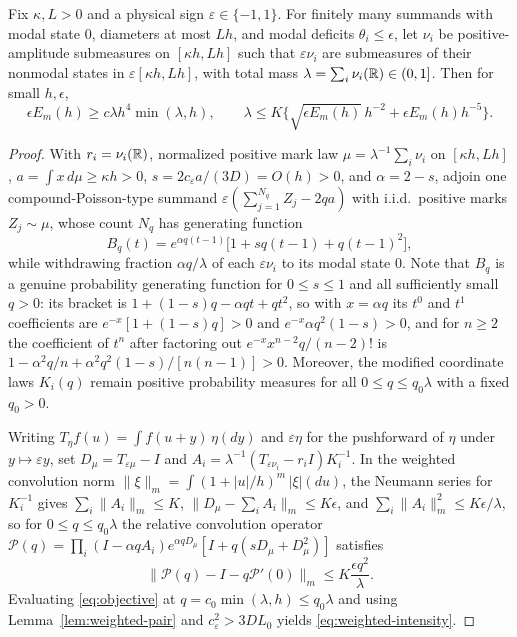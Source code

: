 \begin{lemma}\label{lem:weighted-intensity}
Fix $\kappa,L>0$ and a physical sign $\varepsilon\in\{-1,1\}$. For finitely
many summands with modal state $0$, diameters at most $Lh$, and modal deficits
$\theta_i\le\epsilon$, let $\nu_i$ be positive-amplitude submeasures on
$[\kappa h,Lh]$ such that $\varepsilon\nu_i$ are submeasures of their nonmodal
states in $\varepsilon[\kappa h,Lh]$, with total mass
$\lambda=\sum_i\nu_i(\mathbb R)\in(0,1]$. Then for small $h,\epsilon$,
\begin{equation}\label{eq:weighted-intensity}
 \epsilon E_m(h)\ge c\lambda h^4\min(\lambda,h),\qquad
 \lambda\le K\bigl\{\sqrt{\epsilon E_m(h)}\,h^{-2}
                              +\epsilon E_m(h)h^{-5}\bigr\}.
\end{equation}
\end{lemma}
\begin{proof}
With $r_i=\nu_i(\mathbb R)$, normalized positive mark law $\mu=\lambda^{-1}\sum_i\nu_i$
on $[\kappa h,Lh]$, $a=\int x\,d\mu\ge\kappa h>0$,
$s=2c_\varepsilon a/(3D)=O(h)>0$, and $\alpha=2-s$, adjoin one
compound-Poisson-type summand $\varepsilon(\sum_{j=1}^{N_q}Z_j-2qa)$ with
i.i.d.\ positive marks $Z_j\sim\mu$, whose count $N_q$ has generating function
\begin{equation}\label{eq:weighted-compound-pgf}
 B_q(t)=e^{\alpha q(t-1)}
                         \bigl[1+sq(t-1)+q(t-1)^2\bigr],
\end{equation}
while withdrawing fraction $\alpha q/\lambda$ of each $\varepsilon\nu_i$ to its
modal state $0$. Note that $B_q$ is a genuine probability generating function for
$0\le s\le1$ and all sufficiently small $q>0$: its bracket is
$1+(1-s)q-\alpha qt+qt^2$, so with $x=\alpha q$ its $t^0$ and $t^1$
coefficients are $e^{-x}[1+(1-s)q]>0$ and $e^{-x}\alpha q^2(1-s)>0$, and for
$n\ge2$ the coefficient of $t^n$ after factoring out $e^{-x}x^{n-2}q/(n-2)!$
is $1-\alpha^2q/n+\alpha^2q^2(1-s)/[n(n-1)]>0$. Moreover, the modified
coordinate laws $K_i(q)$ remain positive probability measures for all
$0\le q\le q_0\lambda$ with a fixed $q_0>0$.

Writing $T_\eta f(u)=\int f(u+y)\,\eta(dy)$ and $\varepsilon\eta$ for the
pushforward of $\eta$ under $y\mapsto\varepsilon y$, set
$D_\mu=T_{\varepsilon\mu}-I$ and
$A_i=\lambda^{-1}(T_{\varepsilon\nu_i}-r_iI)K_i^{-1}$. In the weighted
convolution norm $\|\xi\|_m=\int(1+|u|/h)^m\,|\xi|(du)$, the Neumann series
for $K_i^{-1}$ gives $\sum_i\|A_i\|_m\le K$, $\|D_\mu-\sum_i A_i\|_m\le K\epsilon$,
and $\sum_i\|A_i\|_m^2\le K\epsilon/\lambda$, so for $0\le q\le q_0\lambda$
the relative convolution operator
$\mathcal P(q)=\prod_i(I-\alpha qA_i)e^{\alpha qD_\mu}[I+q(sD_\mu+D_\mu^2)]$
satisfies
\begin{equation}\label{eq:weighted-relative-error}
 \|\mathcal P(q)-I-q\mathcal P'(0)\|_m
                                      \le K\frac{\epsilon q^2}{\lambda}.
\end{equation}
Evaluating \eqref{eq:objective} at $q=c_0\min(\lambda,h)\le q_0\lambda$ and
using Lemma~\ref{lem:weighted-pair} and $c_\varepsilon^2>3DL_0$ yields
\eqref{eq:weighted-intensity}.
\end{proof}

